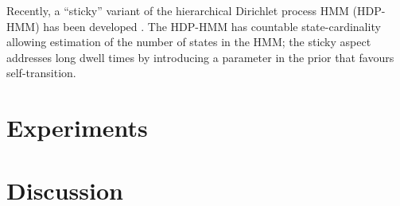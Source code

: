 \documentclass[journal]{oldtran/IEEEtran}
\begin{document}
Recently, a ``sticky'' variant of the hierarchical Dirichlet process HMM (HDP-HMM) has been developed \cite{Fox2008}.  The HDP-HMM has countable state-cardinality \cite{Teh06} allowing estimation of the number of states in the HMM; the sticky aspect addresses long dwell times by introducing a parameter in the prior that favours self-transition. 


\section{Experiments}

\label{sec:experiments}




\section{Discussion}

\label{sec:dicussion}






\end{document}
